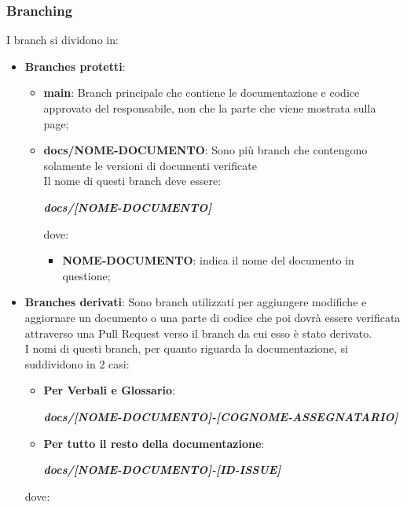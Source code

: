         \subsubsection{Branching}\label{inf:branch}
        I branch si dividono in:
        \begin{itemize}
            \item \textbf{Branches protetti}: 
            \begin{itemize}
                \item \textbf{main}: Branch principale che contiene le documentazione e codice approvato del responsabile, non che la parte che viene mostrata sulla page;
                \item \textbf{docs/NOME-DOCUMENTO}: Sono più branch che contengono solamente le versioni di documenti verificate\\
                Il nome di questi branch deve essere:
                \begin{center}
                    \textbf{\textit{docs/[NOME-DOCUMENTO]}}
                \end{center}
                dove:
                \begin{itemize}
                    \item \textbf{NOME-DOCUMENTO}: indica il nome del documento in questione;
                \end{itemize}
            \end{itemize}
            \item \textbf{Branches derivati}: Sono branch utilizzati per aggiungere modifiche e aggiornare un documento o una parte di codice che poi dovrà essere verificata
            attraverso una Pull Request verso il branch da cui esso è stato derivato.\\
            I nomi di questi branch, per quanto riguarda la documentazione, si suddividono in 2 casi:
            \begin{itemize}
                \item \textbf{Per Verbali e Glossario}:
                \begin{center}
                    \textbf{\textit{docs/[NOME-DOCUMENTO]-[COGNOME-ASSEGNATARIO]}}
                \end{center}
                \item \textbf{Per tutto il resto della documentazione}:
                \begin{center}
                    \textbf{\textit{docs/[NOME-DOCUMENTO]-[ID-ISSUE]}}
                \end{center}
            \end{itemize}
            dove:
    

\end{itemize}
